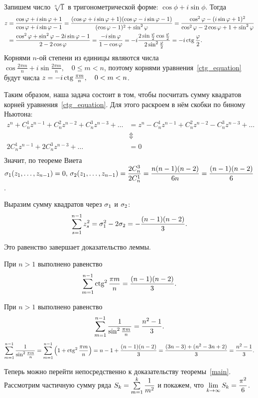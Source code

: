 \documentclass[a4paper,12pt,fleqn]{article}
\begin{document}
Запишем число $\sqrt[n]{1}$ в тригонометрической форме: $\cos\phi + i\sin\phi$. Тогда 
\[
\begin{aligned}
z &= \frac{\cos\phi + i\sin\phi + 1}{\cos\phi + i\sin\phi - 1} 
  = \frac{(\cos\phi + i\sin\phi + 1)(\cos\phi - i\sin\phi - 1)}{(\cos\phi - 1)^2 + \sin^2\phi}
  = \frac{\cos^2\phi - (i\sin\phi + 1)^2}{\cos^2\phi - 2\cos\phi + 1 + \sin^2\phi} \\
  &= \frac{\cos^2\phi + \sin^2\phi - 2i\sin\phi - 1}{2 - 2\cos\phi} 
  = \frac{-i\sin\phi}{1 - \cos\phi} 
  = -i\frac{2\sin\frac{\phi}{2}\cos\frac{\phi}{2}}{2\sin^2\frac{\phi}{2}}
  = -i \ctg\frac{\phi}{2}.
\end{aligned}
\]
Корнями $n$-ой степени из единицы являются числа $\cos\frac{2\pi m}{n} + i \sin\frac{2\pi m}{n}, \quad 0 \le m < n$, поэтому корнями уравнения~\ref{ctg_equation} будут числа $z = -i\ctg\frac{\pi m}{n}, \quad 0 < m < n$.

Таким образом, наша задача состоит в том, чтобы посчитать сумму квадратов корней уравнения~\ref{ctg_equation}. Для этого раскроем в нём скобки по биному Ньютона:
\[
\begin{aligned}
z^n + C_n^1 z^{n-1} + C_n^2 z^{n-2} + C_n^3 z^{n-3} + \ldots &= z^n - C_n^1 z^{n-1} + C_n^2 z^{n-2} - C_n^3 z^{n-3} + \ldots\\
&\Updownarrow\\
2 C_n^1 z^{n-1} + 2 C_n^3 z^{n-3} + \ldots &= 0\\
\end{aligned}
\]
Значит, по теореме Виета $\sigma_1(z_1,\ldots,z_{n-1}) = 0,\, \sigma_2(z_1,\ldots,z_{n-1}) = \dfrac{2C_n^3}{2C_n^1} = \dfrac{n(n-1)(n-2)}{6n} = \dfrac{(n-1)(n-2)}{6}$.

Выразим сумму квадратов через $\sigma_1$ и $\sigma_2$:
\[
\sum\limits_{{s=1}}^{{n-1}}z_s^2 = \sigma_1^2 - 2\sigma_2 = -\frac{(n-1)(n-2)}{3}.
\]

Это равенство завершает доказательство леммы.

При $n > 1$ выполнено равенство
\[
\suml{m=1}{n-1} \ctg^2\frac{\pi m}{n} = \frac{(n-1)(n-2)}3.
\]




При $n > 1$ выполнено равенство
\[
\sum\limits_{{m=1}}^{{n-1}} \frac1{\sin^2\frac{\pi m}{n}} = \frac{n^2 - 1}3.
\]
\[
\suml{m=1}{n-1} \frac1{\sin^2\frac{\pi m}{n}} = \suml{m=1}{n-1} \hr{1 + \ctg^2\frac{\pi m}{n}} = n-1 + \frac{(n-1)(n-2)}3 = \frac{(3n-3) + (n^2-3n+2)}{3} = \frac{n^2 - 1}{3}.
\]

\newpage
Теперь можно перейти непосредственно к доказательству теоремы~\ref{main}.
Рассмотрим частичную сумму ряда $S_k = \sum\limits_{{m=1}}^{{k}} \dfrac{1}{m^2}$ и покажем, что $\lim\limits_{k \rightarrow \infty} S_k = \dfrac{\pi^2}{6}$.
\end{document}

